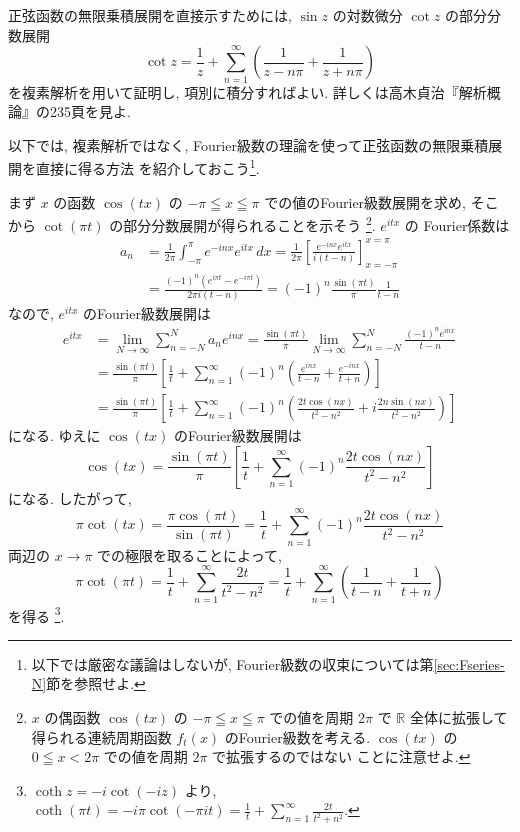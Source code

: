 \documentclass[12pt,twoside]{jarticle}
\newcommand\R{{\mathbb R}} %
\theoremstyle{jplain}
\theoremstyle{jplain}
\theoremstyle{jplain}
\numberwithin{theorem}{section}
\numberwithin{equation}{section}
\numberwithin{figure}{section}
\numberwithin{table}{section}
\newcommand\secref[1]{第\ref{#1}節}
\begin{document}
正弦函数の無限乗積展開を直接示すためには, 
$\sin z$ の対数微分 $\cot z$ の部分分数展開
\[
\cot z 
= \frac{1}{z} 
+ \sum_{n=1}^\infty\left(\frac{1}{z-n\pi}+\frac{1}{z+n\pi}\right)
\]
を複素解析を用いて証明し, 項別に積分すればよい.
詳しくは高木貞治『解析概論』の235頁を見よ.

以下では, 複素解析ではなく, 
Fourier級数の理論を使って正弦函数の無限乗積展開を直接に得る方法
を紹介しておこう\footnote{以下では厳密な議論はしないが,
Fourier級数の収束については\secref{sec:Fseries-N}を参照せよ.}. 

まず $x$ の函数 $\cos(tx)$ の $-\pi\leqq x\leqq\pi$ での値のFourier級数展開を求め, 
そこから $\cot(\pi t)$ の部分分数展開が得られることを示そう%
\footnote{$x$ の偶函数 $\cos(tx)$ の $-\pi\leqq x\leqq\pi$ での値を周期 $2\pi$ 
で $\R$ 全体に拡張して得られる連続周期函数 $f_t(x)$ のFourier級数を考える.
$\cos(tx)$ の $0\leqq x<2\pi$ での値を周期 $2\pi$ で拡張するのではない
ことに注意せよ.
}.
$e^{itx}$ の Fourier係数は
\begin{align*}
a_n 
&= \frac{1}{2\pi}\int_{-\pi}^\pi e^{-inx}e^{itx}\,dx
=\frac{1}{2\pi}\left[ \frac{e^{-inx}e^{itx}}{i(t-n)} \right]_{x=-\pi}^{x=\pi}
\\ &
=\frac{(-1)^n(e^{i\pi t}-e^{-i\pi t})}{2\pi i(t-n)}
=(-1)^n\frac{\sin(\pi t)}{\pi}\frac{1}{t-n}
\end{align*}
なので, $e^{itx}$ のFourier級数展開は
\begin{align*}
e^{itx}
&=\lim_{N\to\infty} \sum_{n=-N}^N a_n e^{inx}
=\frac{\sin(\pi t)}{\pi}
\lim_{N\to\infty} \sum_{n=-N}^N \frac{(-1)^n e^{inx}}{t-n}
\\ &
=\frac{\sin(\pi t)}{\pi} \left[
  \frac{1}{t} 
  + \sum_{n=1}^\infty (-1)^n 
    \left(\frac{e^{inx}}{t-n}+\frac{e^{-inx}}{t+n} \right)
\right]
\\ &
=\frac{\sin(\pi t)}{\pi} \left[
  \frac{1}{t} 
  + \sum_{n=1}^\infty (-1)^n 
    \left(\frac{2t\cos(nx)}{t^2-n^2}+i\frac{2n\sin(nx)}{t^2-n^2} \right)
\right]
\end{align*}
になる. ゆえに $\cos(tx)$ のFourier級数展開は
\[
\cos(tx)
=\frac{\sin(\pi t)}{\pi}
\left[
  \frac{1}{t} + \sum_{n=1}^\infty (-1)^n\frac{2t\cos(nx)}{t^2-n^2}
\right]
\]
になる. したがって, 
\[
\pi\cot(tx)
=\frac{\pi\cos(\pi t)}{\sin(\pi t)}
=\frac{1}{t} + \sum_{n=1}^\infty (-1)^n\frac{2t\cos(nx)}{t^2-n^2}
\]
両辺の $x\to\pi$ での極限を取ることによって,
\[
\pi\cot(\pi t)
=\frac{1}{t} + \sum_{n=1}^\infty\frac{2t}{t^2-n^2}
=\frac{1}{t} + \sum_{n=1}^\infty\left(\frac{1}{t-n}+\frac{1}{t+n}\right)
\]
を得る%
\footnote{$\coth z=-i\cot(-iz)$ より,
\(\displaystyle
\coth(\pi t)=-i\pi\cot(-\pi i t)
=\frac{1}{t} + \sum_{n=1}^\infty\frac{2t}{t^2+n^2}.
\)}.
\end{document}
